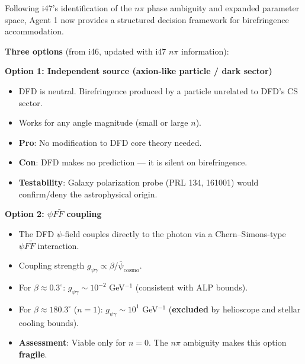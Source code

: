 \documentclass[11pt,a4paper]{article}
\newcommand{\NEW}{\textcolor{dfdblue}{\textbf{NEW}}}
\begin{document}
\begin{tcolorbox}[colback=yellow!5!white, colframe=yellow!60!black,
  title={\NEW: i48 Birefringence Accommodation Analysis --- Which Option for DFD?}]

Following i47's identification of the $n\pi$ phase ambiguity and expanded parameter space, Agent 1 now provides a structured decision framework for birefringence accommodation.

\textbf{Three options} (from i46, updated with i47 $n\pi$ information):

\medskip
\textbf{Option 1: Independent source (axion-like particle / dark sector)}
\begin{itemize}
\item DFD is neutral. Birefringence produced by a particle unrelated to DFD's CS sector.
\item Works for any angle magnitude (small or large $n$).
\item \textbf{Pro}: No modification to DFD core theory needed.
\item \textbf{Con}: DFD makes no prediction --- it is silent on birefringence.
\item \textbf{Testability}: Galaxy polarization probe (PRL 134, 161001) would confirm/deny the astrophysical origin.
\end{itemize}

\medskip
\textbf{Option 2: $\psi F \tilde{F}$ coupling}
\begin{itemize}
\item The DFD $\psi$-field couples directly to the photon via a Chern--Simons-type $\psi F \tilde{F}$ interaction.
\item Coupling strength $g_{\psi\gamma} \propto \beta / \bar{\psi}_{\text{cosmo}}$.
\item For $\beta \approx 0.3^\circ$: $g_{\psi\gamma} \sim 10^{-2}$ GeV$^{-1}$ (consistent with ALP bounds).
\item For $\beta \approx 180.3^\circ$ ($n = 1$): $g_{\psi\gamma} \sim 10^{1}$ GeV$^{-1}$ (\textbf{excluded} by helioscope and stellar cooling bounds).
\item \textbf{Assessment}: Viable only for $n = 0$. The $n\pi$ ambiguity makes this option \textbf{fragile}.
\end{itemize}


\end{tcolorbox}
\end{document}
